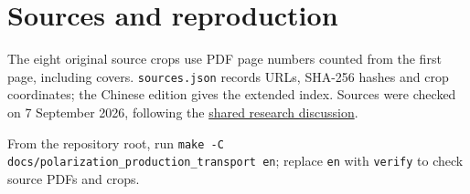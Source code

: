 \documentclass[11pt,a4paper]{article}
\begin{document}
\clearpage
\section*{Sources and reproduction}
The eight original source crops use PDF page numbers counted from the first page, including covers. \texttt{sources.json} records URLs, SHA-256 hashes and crop coordinates; the Chinese edition gives the extended index. Sources were checked on 7 September 2026, following the \href{https://chatgpt.com/share/6a9e507f-ba88-83ee-930f-861c5ef504c1}{shared research discussion}.

From the repository root, run \texttt{make -C docs/polarization\_production\_transport en}; replace \texttt{en} with \texttt{verify} to check source PDFs and crops.

\begingroup\footnotesize
\linespread{1.0}\selectfont
\setlength{\bibsep}{0pt}


\endgroup
\end{document}
